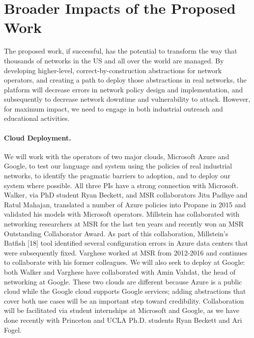 \section{Broader Impacts of the Proposed Work}
\label{sec:impact}

The proposed work, if successful, has the potential to transform the way
that thousands of networks in the US and all over the world are managed.
By developing higher-level, correct-by-construction abstractions for
network operators, and creating a path to deploy those abstractions
in real networks, the \Name platform will decrease
errors in network policy design and implementation, and subsequently
to decrease network downtime and vulnerability to attack.  However,
for maximum impact, we need to engage in both industrial outreach and
educational activities.

\paragraph*{Cloud Deployment.} 
We will work with the operators of two major clouds, Microsoft Azure and Google, to test our language and system using the policies of real industrial networks, to identify the pragmatic barriers to adoption, and to deploy our system where possible.
All three PIs have a strong connection with Microsoft. Walker, via PhD student Ryan Beckett, and MSR collaborators Jitu Padhye and Ratul Mahajan, translated a number of Azure policies into Propane in 2015 and validated his models with Microsoft operators. Millstein has collaborated with networking researchers at MSR for the last ten years and recently won an MSR Outstanding Collaborator Award. As part of this collaboration, Millstein's Batfish [18] tool identified several configuration errors in Azure data centers that were subsequently fixed. Varghese worked at MSR from 2012-2016 and continues to collaborate with his former colleagues. We will also seek to deploy at Google: both Walker and Varghese have collaborated with Amin Vahdat, the head of networking at Google. These two clouds are different because Azure is a public cloud while the Google cloud supports Google services; adding abstractions that cover both use cases will be an important step toward credibility. Collaboration will be facilitated via student internships at Microsoft and Google, as we have done recently with Princeton and UCLA Ph.D. students Ryan Beckett and Ari Fogel.

